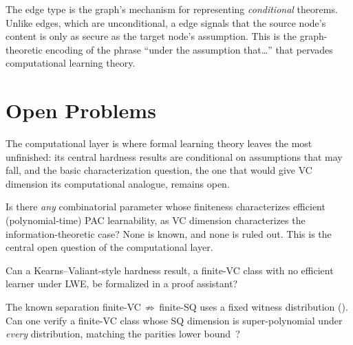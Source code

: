 \begin{remark}
\label{rmk:requires-assumption-structure}
The  edge type is the graph's mechanism for
representing \emph{conditional} theorems.  Unlike  edges, which
are unconditional, a  edge signals that the source
node's content is only as secure as the target node's assumption.  This is
the graph-theoretic encoding of the phrase ``under the assumption that\ldots''
that pervades computational learning theory.
\end{remark}



\section{Open Problems}
\label{sec:computational-open}

The computational layer is where formal learning theory leaves the most
unfinished: its central hardness results are conditional on assumptions that
may fall, and the basic characterization question, the one that would give VC
dimension its computational analogue, remains open.

\begin{openprob}
\label{op:efficient-dimension}
Is there \emph{any} combinatorial parameter whose finiteness characterizes
efficient (polynomial-time) PAC learnability, as VC dimension characterizes
the information-theoretic case?  None is known, and none is ruled out.  This
is the central open question of the computational layer.
\end{openprob}

\begin{openprob}
\label{op:formalize-kv}
Can a Kearns--Valiant-style hardness result, a finite-VC class with no
efficient learner under LWE, be formalized in a proof
assistant?~\cite{KearnsValiant1994,Daniely2021}
\end{openprob}

\begin{openprob}
\label{op:sq-distribution-free}
The known separation finite-VC$\,\not\Rightarrow\,$finite-SQ uses a
fixed witness distribution ().  Can one
verify a finite-VC class whose SQ dimension is super-polynomial under
\emph{every} distribution, matching the parities lower
bound~\cite{BlumFurstJacksonKearnsMansourRudich1994}?
\end{openprob}


